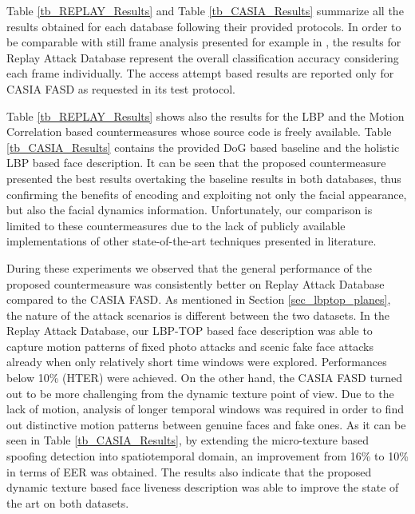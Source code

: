 Table \ref{tb_REPLAY_Results} and Table \ref{tb_CASIA_Results} summarize all the results obtained for each database following their provided protocols. In order to be comparable with still frame analysis presented for example in \cite{ChingovskaBIOSIG2012}, the results for Replay Attack Database represent the overall classification accuracy considering each frame individually. The access attempt based results are reported only for CASIA FASD as requested in its test protocol.

Table \ref{tb_REPLAY_Results} shows also the results for the LBP \citep{ChingovskaBIOSIG2012} and the Motion Correlation \citep{AnjosIJCB2011} based countermeasures whose source code is freely available. Table \ref{tb_CASIA_Results} contains the provided DoG based baseline and the holistic LBP based face description. It can be seen that the proposed countermeasure presented the best results overtaking the baseline results in both databases, thus confirming the benefits of encoding and exploiting not only the facial appearance, but also the facial dynamics information. Unfortunately, our comparison is limited to these countermeasures due to the lack of publicly available implementations of other state-of-the-art techniques presented in literature. 

During these experiments we observed that the general performance of the proposed countermeasure was consistently better on Replay Attack Database compared to the CASIA FASD. As mentioned in Section \ref{sec_lbptop_planes}, the nature of the attack scenarios is different between the two datasets. In the Replay Attack Database, our LBP-TOP based face description was able to capture motion patterns of fixed photo attacks and scenic fake face attacks already when only relatively short time windows were explored. Performances below 10\% (HTER) were achieved. On the other hand, the CASIA FASD turned out to be more challenging from the dynamic texture point of view. Due to the lack of motion, analysis of longer temporal windows was required in order to find out distinctive motion patterns between genuine faces and fake ones. As it can be seen in Table \ref{tb_CASIA_Results}, by extending the micro-texture based spoofing detection into spatiotemporal domain, an improvement from 16\% to 10\% in terms of EER was obtained. The results also indicate that the proposed dynamic texture based face liveness description was able to improve the state of the art on both datasets.


